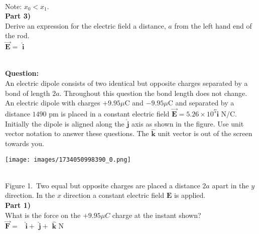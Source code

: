 \documentclass[addpoints,12pt, margin-left=35px]{exam}
\begin{document}
\\

Note: $x_0 < x_1.$\\

\textbf{Part 3)}\\

Derive an expression for the electric field a distance, $ a $ from the left hand end of the rod.\\

$ \mathbf{\vec{E}} = $  \underline{\hspace{3cm}}  $\mathbf{\hat{i}} $ \\

\\

\newpage

\textbf{Question:}\\

An electric dipole consists of two identical but opposite charges separated by a bond of length $2a.$ Throughout this question the bond length does not change. An electric dipole with charges $+ {9.95} \mu \text{C}$ and $- {9.95} \mu \text{C}$ and separated by a distance ${1490} \text{ pm}$ is placed in a constant electric field $\mathbf{\vec{E}} = {5.26 \times 10^{5}} \mathbf{\hat{i}} \text{ N/C.}$ Initially the dipole is aligned along the $\mathbf{\hat{j}}$ axis as shown in the figure. Use unit vector notation to answer these questions. The $\mathbf{\hat{k}}$ unit vector is out of the screen towards you.\\

\begin{center}
\texttt{[image: images/1734050998390\_0.png]}
\end{center}\\

Figure 1. Two equal but opposite charges are placed a distance $2a$ apart in the $y$ direction. In the $x$ direction a constant electric field $\textbf{E}$ is applied.\\

\textbf{Part 1)}\\

What is the force on the $+ {9.95} \mu C $ charge at the instant shown?\\

$\mathbf{\vec{F}} = $  \underline{\hspace{3cm}}  $ \mathbf{\hat{i}} + $  \underline{\hspace{3cm}}  $\mathbf{\hat{j}} + $ \underline{\hspace{3cm}}  $\mathbf{\hat{k}} \text{ N}$ \\
\end{document}
